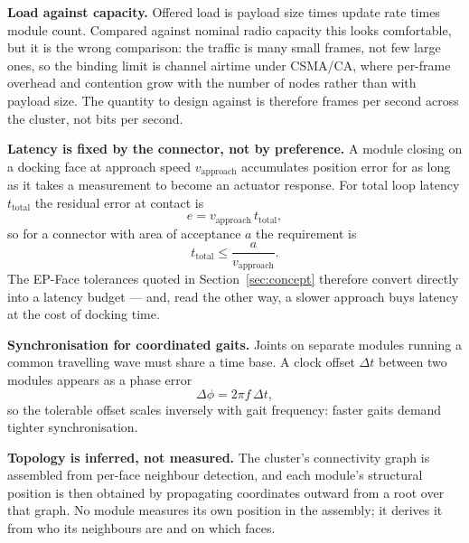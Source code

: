 \documentclass[11pt,a4paper]{article}
\newif\ifreview
\newcommand{\pending}[1]{\ifreview{\color{blue}#1}\else#1\fi}
\newcounter{gsec}
\newcounter{gsub}
\newcommand{\curgsec}{}
\newcommand{\gsep}{\texorpdfstring{\quad}{ }}
\newcommand{\gtocsub}[2]{%
  \phantomsection
  \addcontentsline{toc}{subsection}{#1\gsep #2}%
}
\newcommand{\gsubsection}[1]{%
  \refstepcounter{gsub}%
  \edef\gsublbl{\curgsec.\thegsub}%
  \expandafter\gtocsub\expandafter{\gsublbl}{#1}%
  \subsection*{\gsublbl\quad #1}%
}
\begin{document}
\pending{%
\noindent\textbf{Load against capacity.} Offered load is payload size times
update rate times module count. Compared against nominal radio capacity this
looks comfortable, but it is the wrong comparison: the traffic is many small
frames, not few large ones, so the binding limit is channel airtime under
CSMA/CA, where per-frame overhead and contention grow with the number of nodes
rather than with payload size. The quantity to design against is therefore
frames per second across the cluster, not bits per second.

\noindent\textbf{Latency is fixed by the connector, not by preference.} A
module closing on a docking face at approach speed $v_{\text{approach}}$
accumulates position error for as long as it takes a measurement to become an
actuator response. For total loop latency $t_{\text{total}}$ the residual error
at contact is
\begin{equation}
  e = v_{\text{approach}}\,t_{\text{total}},
\end{equation}
so for a connector with area of acceptance $a$ the requirement is
\begin{equation}
  t_{\text{total}} \le \frac{a}{v_{\text{approach}}}.
\end{equation}
The EP-Face tolerances quoted in Section~\ref{sec:concept} therefore convert
directly into a latency budget --- and, read the other way, a slower approach
buys latency at the cost of docking time.

\noindent\textbf{Synchronisation for coordinated gaits.} Joints on separate
modules running a common travelling wave must share a time base. A clock offset
$\Delta t$ between two modules appears as a phase error
\begin{equation}
  \Delta\phi = 2\pi f\,\Delta t ,
\end{equation}
so the tolerable offset scales inversely with gait frequency: faster gaits
demand tighter synchronisation.

\noindent\textbf{Topology is inferred, not measured.} The cluster's
connectivity graph is assembled from per-face neighbour detection, and each
module's structural position is then obtained by propagating coordinates
outward from a root over that graph. No module measures its own position in the
assembly; it derives it from who its neighbours are and on which faces.
}

\pending{}
\end{document}
